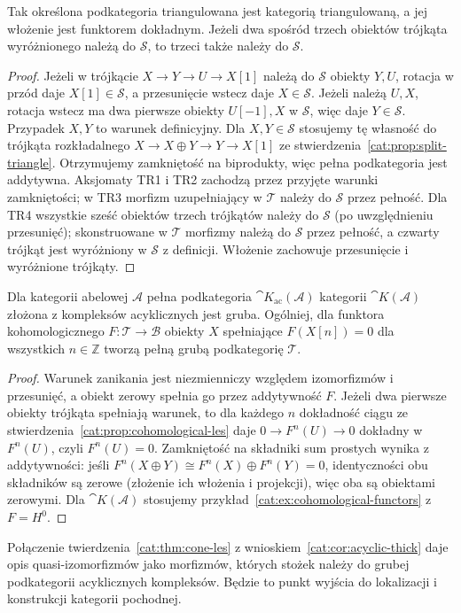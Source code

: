 \begin{stwierdzenie}\label{cat:prop:triangulated-subcategory}
Tak określona podkategoria triangulowana jest kategorią triangulowaną, a jej włożenie jest funktorem dokładnym. Jeżeli dwa spośród trzech obiektów trójkąta wyróżnionego należą do $\mathcal S$, to trzeci także należy do $\mathcal S$.
\end{stwierdzenie}
\begin{proof}
Jeżeli w trójkącie $X\to Y\to U\to X[1]$ należą do $\mathcal S$ obiekty $Y,U$, rotacja w przód daje $X[1]\in\mathcal S$, a przesunięcie wstecz daje $X\in\mathcal S$. Jeżeli należą $U,X$, rotacja wstecz ma dwa pierwsze obiekty $U[-1],X$ w $\mathcal S$, więc daje $Y\in\mathcal S$. Przypadek $X,Y$ to warunek definicyjny. Dla $X,Y\in\mathcal S$ stosujemy tę własność do trójkąta rozkładalnego $X\to X\oplus Y\to Y\to X[1]$ ze stwierdzenia~\ref{cat:prop:split-triangle}. Otrzymujemy zamkniętość na biprodukty, więc pełna podkategoria jest addytywna. Aksjomaty TR1 i TR2 zachodzą przez przyjęte warunki zamkniętości; w TR3 morfizm uzupełniający w $\mathcal T$ należy do $\mathcal S$ przez pełność. Dla TR4 wszystkie sześć obiektów trzech trójkątów należy do $\mathcal S$ (po uwzględnieniu przesunięć); skonstruowane w $\mathcal T$ morfizmy należą do $\mathcal S$ przez pełność, a czwarty trójkąt jest wyróżniony w $\mathcal S$ z definicji. Włożenie zachowuje przesunięcie i wyróżnione trójkąty.
\end{proof}
\begin{wniosek}\label{cat:cor:acyclic-thick}
Dla kategorii abelowej $\mathcal A$ pełna podkategoria $\cat K_{\mathrm{ac}}(\mathcal A)$ kategorii $\cat K(\mathcal A)$ złożona z kompleksów acyklicznych jest gruba. Ogólniej, dla funktora kohomologicznego $F:\mathcal T\to\mathcal B$ obiekty $X$ spełniające $F(X[n])=0$ dla wszystkich $n\in\mathbb Z$ tworzą pełną grubą podkategorię $\mathcal T$.
\end{wniosek}
\begin{proof}
Warunek zanikania jest niezmienniczy względem izomorfizmów i przesunięć, a obiekt zerowy spełnia go przez addytywność $F$. Jeżeli dwa pierwsze obiekty trójkąta spełniają warunek, to dla każdego $n$ dokładność ciągu ze stwierdzenia~\ref{cat:prop:cohomological-les} daje $0\to F^n(U)\to0$ dokładny w $F^n(U)$, czyli $F^n(U)=0$. Zamkniętość na składniki sum prostych wynika z addytywności: jeśli $F^n(X\oplus Y)\cong F^n(X)\oplus F^n(Y)=0$, identyczności obu składników są zerowe (złożenie ich włożenia i projekcji), więc oba są obiektami zerowymi. Dla $\cat K(\mathcal A)$ stosujemy przykład~\ref{cat:ex:cohomological-functors} z $F=H^0$.
\end{proof}
\begin{uwaga}
Połączenie twierdzenia~\ref{cat:thm:cone-les} z wnioskiem~\ref{cat:cor:acyclic-thick} daje opis quasi-izomorfizmów jako morfizmów, których stożek należy do grubej podkategorii acyklicznych kompleksów. Będzie to punkt wyjścia do lokalizacji i konstrukcji kategorii pochodnej.
\end{uwaga}

